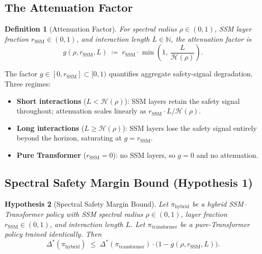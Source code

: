 \documentclass{article}
\newtheorem{theorem}{Hypothesis}[section]
\newtheorem{definition}[theorem]{Definition}
\newcommand{\rSSM}{r_{\mathrm{SSM}}}
\newcommand{\deltaStar}{\Delta^{*}}
\newcommand{\piHybrid}{\pi_{\mathrm{hybrid}}}
\newcommand{\piTrans}{\pi_{\mathrm{transformer}}}
\newcommand{\Horizon}{\mathcal{H}(\rho)}
\begin{document}
\subsection{The Attenuation Factor}
\label{sec:attenuation-theory}

\begin{definition}[Attenuation Factor]
\label{def:atten}
For spectral radius $\rho \in (0,1)$, SSM layer fraction $\rSSM \in (0,1)$, and interaction length $L \in \mathbb{N}$, the \emph{attenuation factor} is
\begin{equation}
    g(\rho, \rSSM, L) \;\coloneqq\; \rSSM \cdot \min\!\left(1,\, \frac{L}{\Horizon}\right).
    \label{eq:atten-formal}
\end{equation}
\end{definition}

The factor $g \in [0, \rSSM] \subset [0,1)$ quantifies aggregate safety-signal degradation. Three regimes:

\begin{itemize}
    \item \textbf{Short interactions} ($L < \Horizon$): SSM layers retain the safety signal throughout; attenuation scales linearly as $\rSSM \cdot L / \Horizon$.
    \item \textbf{Long interactions} ($L \geq \Horizon$): SSM layers lose the safety signal entirely beyond the horizon, saturating at $g = \rSSM$.
    \item \textbf{Pure Transformer} ($\rSSM = 0$): no SSM layers, so $g = 0$ and no attenuation.
\end{itemize}

\subsection{Spectral Safety Margin Bound (Hypothesis 1)}
\label{sec:main-theorem}

\begin{theorem}[Spectral Safety Margin Bound]
\label{thm:margin-bound}
Let $\piHybrid$ be a hybrid SSM--Transformer policy with SSM spectral radius $\rho \in (0,1)$, layer fraction $\rSSM \in (0,1)$, and interaction length $L$. Let $\piTrans$ be a pure-Transformer policy trained identically. Then
\begin{equation}
    \deltaStar(\piHybrid) \;\leq\; \deltaStar(\piTrans) \cdot \bigl(1 - g(\rho, \rSSM, L)\bigr).
    \label{eq:margin-bound-formal}
\end{equation}
\end{theorem}
\end{document}
